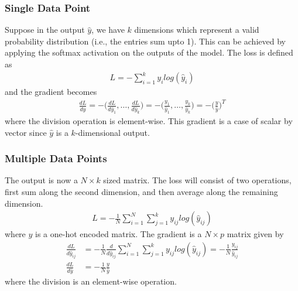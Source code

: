 \documentclass[../../deep_learning_notes.tex]{subfiles}
\begin{document}
\subsubsection*{Single Data Point}
Suppose in the output $\hat{y}$, we have $k$ dimensions which represent a valid probability distribution (i.e., the entries sum upto 1). This can be achieved by applying the softmax activation on the outputs of the model. The loss is defined as
\begin{align*}
    L = -\sum_{i=1}^{k}y_{i}log(\hat{y}_{i})
\end{align*}
and the gradient becomes
\begin{align*}
    \frac{dL}{d\hat{y}} = -\bigg(\frac{dL}{d\hat{y}_{1}}, \ldots, \frac{dL}{d\hat{y}_{k}} \bigg)
    =-\bigg(\frac{y_{1}}{\hat{y}_{1}}, \ldots, \frac{y_{k}}{\hat{y}_{k}} \bigg)
    = -\bigg(\frac{y}{\hat{y}} \bigg)^{T}
\end{align*}
where the division operation is element-wise. This gradient is a case of scalar by vector since $\hat{y}$ is a $k$-dimensional output.


\subsubsection*{Multiple Data Points}
The output is now a $N \times k$ sized matrix. The loss will consist of two operations, first sum along the second dimension, and then average along the remaining dimension.
\begin{align*}
    L = -\frac{1}{N} \sum_{i=1}^{N} \sum_{j=1}^{k} y_{ij}log(\hat{y}_{ij})
\end{align*}
where $y$ is a one-hot encoded matrix. The gradient is a $N \times p$ matrix given by
\begin{align*}
    \frac{dL}{d\hat{y}_{ij}} &= -\frac{1}{N} \frac{d}{d\hat{y}_{ij}} \sum_{i=1}^{N} \sum_{j=1}^{k} y_{ij}log(\hat{y}_{ij}) 
    = -\frac{1}{N} \frac{y_{ij}}{\hat{y}_{ij}}\\
    \frac{dL}{d\hat{y}} &= -\frac{1}{N} \frac{y}{\hat{y}}
\end{align*}
where the division is an element-wise operation.
\end{document}
